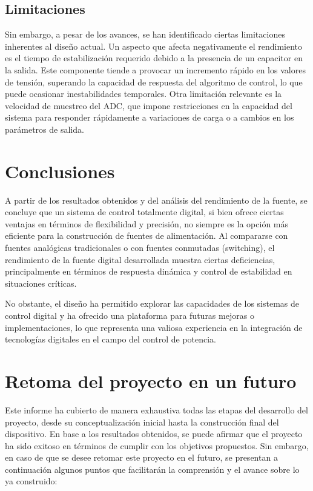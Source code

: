 \subsection{Limitaciones} 
Sin embargo, a pesar de los avances, se han identificado ciertas limitaciones inherentes al diseño actual. 
Un aspecto que afecta negativamente el rendimiento es el tiempo de estabilización requerido debido a la presencia de un capacitor en la salida. Este componente tiende a provocar un incremento rápido en los valores de tensión, superando la capacidad de respuesta del algoritmo de control, lo que puede ocasionar inestabilidades temporales. 
Otra limitación relevante es la velocidad de muestreo del ADC, que impone restricciones en la capacidad del sistema para responder rápidamente a variaciones de carga o a cambios en los parámetros de salida.

\section{Conclusiones} 
A partir de los resultados obtenidos y del análisis del rendimiento de la fuente, se concluye que un sistema de control totalmente digital, si bien ofrece ciertas ventajas en términos de flexibilidad y precisión, no siempre es la opción más eficiente para la construcción de fuentes de alimentación. Al compararse con fuentes analógicas tradicionales o con fuentes conmutadas (switching), el rendimiento de la fuente digital desarrollada muestra ciertas deficiencias, principalmente en términos de respuesta dinámica y control de estabilidad en situaciones críticas.\par
No obstante, el diseño ha permitido explorar las capacidades de los sistemas de control digital y ha ofrecido una plataforma para futuras mejoras o implementaciones, lo que representa una valiosa experiencia en la integración de tecnologías digitales en el campo del control de potencia.

\section{Retoma del proyecto en un futuro} 
Este informe ha cubierto de manera exhaustiva todas las etapas del desarrollo del proyecto, desde su conceptualización inicial hasta la construcción final del dispositivo. En base a los resultados obtenidos, se puede afirmar que el proyecto ha sido exitoso en términos de cumplir con los objetivos propuestos. Sin embargo, en caso de que se desee retomar este proyecto en el futuro, se presentan a continuación algunos puntos que facilitarán la comprensión y el avance sobre lo ya construido:

